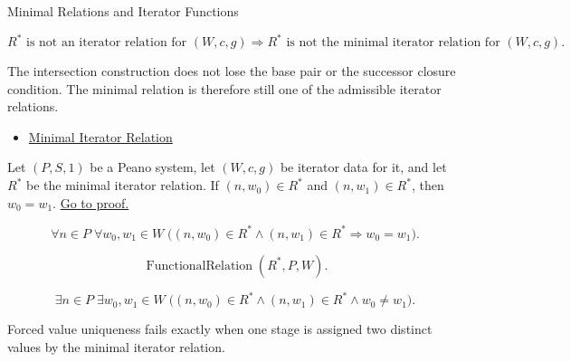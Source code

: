 \begin{topicbox}{Minimal Relations and Iterator Functions}
\begin{remark*}
\[
R^* \text{ is not an iterator relation for } (W,c,g)
\Longrightarrow
R^* \text{ is not the minimal iterator relation for } (W,c,g).
\]
\end{remark*}

\begin{remark*}[Interpretation]
The intersection construction does not lose the base pair or the successor
closure condition. The minimal relation is therefore still one of the
admissible iterator relations.
\end{remark*}

\begin{dependencies}
\begin{itemize}
  \item \hyperref[def:minimal-iterator-relation]{Minimal Iterator Relation}
\end{itemize}
\end{dependencies}

\begin{tcolorbox}[colback=lembox, colframe=lemborder, arc=2pt,
  left=6pt, right=6pt, top=4pt, bottom=4pt,
  title={\small\textbf{Lemma (Forced Values Are Unique)}},
  fonttitle=\small\bfseries]
\begin{lemma}
\label{lem:forced-values-are-unique}
Let $(P,S,1)$ be a Peano system, let $(W,c,g)$ be iterator data for it, and let
$R^*$ be the minimal iterator relation. If $(n,w_0)\in R^*$ and
$(n,w_1)\in R^*$, then $w_0=w_1$.
\hyperref[prf:forced-values-are-unique]{Go to proof.}
\end{lemma}
\end{tcolorbox}

\begin{remark*}
\[
\forall n\in P\;\forall w_0,w_1\in W\;
\bigl((n,w_0)\in R^*\land (n,w_1)\in R^*\Longrightarrow w_0=w_1\bigr).
\]
\end{remark*}

\begin{remark*}
\[
\operatorname{FunctionalRelation}(R^*,P,W).
\]
\end{remark*}

\begin{remark*}
\[
\exists n\in P\;\exists w_0,w_1\in W\;
\bigl((n,w_0)\in R^*\land (n,w_1)\in R^*\land w_0\neq w_1\bigr).
\]
\end{remark*}

\begin{remark*}
Forced value uniqueness fails exactly when one stage is assigned two distinct
values by the minimal iterator relation.
\end{remark*}


\end{topicbox}
